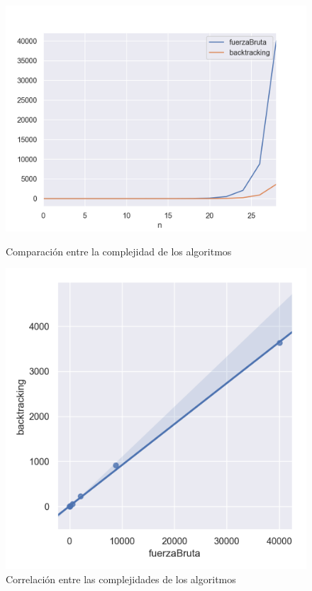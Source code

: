 \begin{figure}[H]
   \begin{minipage}{0.5\textwidth}
     \centering
     \includegraphics[width=0.9\linewidth]{img/fb_vs_bt_1}
     \caption{Comparación entre la complejidad de los algoritmos}
   \end{minipage}\hfill
   \begin{minipage}{0.5\textwidth}
     \centering
     \includegraphics[width=0.9\linewidth]{img/fb_vs_bt_2}
     \caption{Correlación entre las complejidades de los algoritmos}
   \end{minipage}
\end{figure}

